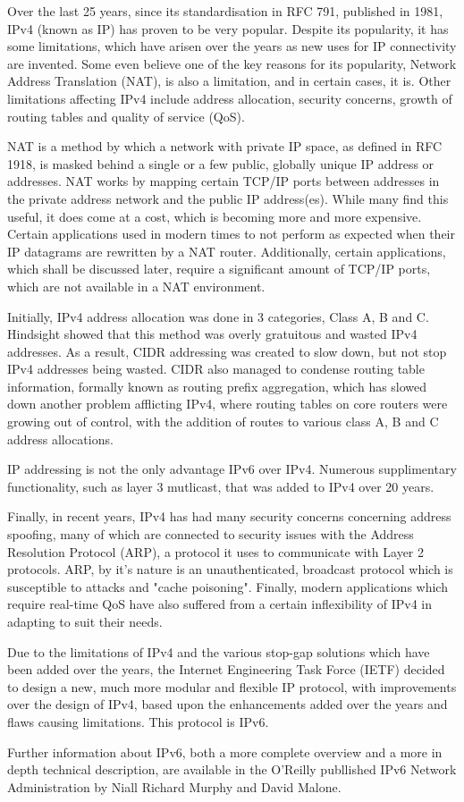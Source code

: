 
Over the last 25 years, since its standardisation in RFC 791, published
in 1981, IPv4 (known as IP) has proven to be very popular. Despite its 
popularity, it has some limitations, which have arisen over the years 
as new uses for IP connectivity are invented. Some even believe one of 
the key reasons for its popularity, Network Address Translation (NAT), 
is also a limitation, and in certain cases, it is. Other limitations
affecting IPv4 include address allocation, security concerns, growth of 
routing tables and quality of service (QoS).


NAT is a method by which a network with private IP space, as defined in
RFC 1918, is masked behind a single or a few public, globally unique IP
address or addresses. NAT works by mapping certain TCP/IP ports between
addresses in the private address network and the public IP address(es).
While many find this useful, it does come at a cost, which is becoming
more and more expensive. Certain applications used in modern times to
not perform as expected when their IP datagrams are rewritten by a NAT
router. Additionally, certain applications, which shall be discussed
later, require a significant amount of TCP/IP ports, which are not
available in a NAT environment.


Initially, IPv4 address allocation was done in 3 categories, Class A, B
and C. Hindsight showed that this method was overly gratuitous and
wasted IPv4 addresses. As a result, CIDR addressing was created to slow 
down, but not stop IPv4 addresses being wasted. CIDR also managed to condense 
routing table information, formally known as routing prefix aggregation, 
which has slowed down another problem afflicting IPv4, where routing tables 
on core routers were growing out of control, with the addition of routes to
various class A, B and C address allocations.


IP addressing is not the only advantage IPv6 over IPv4. Numerous
supplimentary functionality, such as layer 3 mutlicast, that was added to IPv4 over 20 years.

Finally, in recent years, IPv4 has had many security concerns concerning
address spoofing, many of which are connected to security issues with
the Address Resolution Protocol (ARP), a protocol it uses to communicate
with Layer 2 protocols. ARP, by it's nature is an unauthenticated, 
broadcast protocol which is susceptible to attacks and "cache poisoning".
Finally, modern applications which require real-time QoS have also 
suffered from a certain inflexibility of IPv4 in adapting to suit their 
needs.


Due to the limitations of IPv4 and the various stop-gap solutions which
have been added over the years, the Internet Engineering Task Force
(IETF) decided to design a new, much more modular and flexible IP
protocol, with improvements over the design of IPv4, based upon the
enhancements added over the years and flaws causing limitations. This
protocol is IPv6.


Further information about IPv6, both a more complete overview and
a more in depth technical description, are available in the O'Reilly
publlished IPv6 Network Administration by Niall Richard Murphy and 
David Malone.
